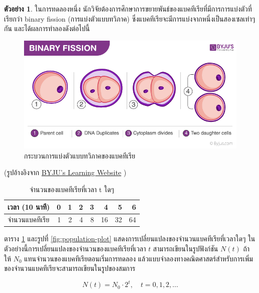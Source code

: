 \documentclass[landscape, 20pt]{extarticle}
\theoremstyle{definition}
\newtheorem{example}{ตัวอย่าง}[section]
\theoremstyle{remark}
\begin{document}
\begin{example}
\protect\hypertarget{exm:exm1}{}\label{exm:exm1}ในการทดลองหนึ่ง นักวิจัยต้องการศึกษาการขยายพันธ์ของแบคทีเรียที่มีการการแบ่งตัวที่เรียกว่า binary fission (การแบ่งตัวแบบทวิภาค) ซึ่งแบคทีเรียจะมีการแบ่งจากหนึ่งเป็นสองเซลเท่าๆ กัน และได้ผลการทำลองดังต่อไปนี้
\end{example}

\begin{figure}
\includegraphics[width=1\linewidth]{fig-binary-fission} \caption{กระบวนการแบ่งตัวแบบทวิภาคของแบคทีเรีย}\label{fig:fig-binary-fission}
\end{figure}

(รูปอ้างอิงจาก \href{https://byjus.com/biology/binary-fission/}{BYJU's Learning Website} )

\begin{table}

\caption{\label{tab:bacteria-table}จำนวนของแบคทีเรียที่เวลา t ใดๆ}
\centering
\begin{tabular}[t]{l|r|r|r|r|r|r|r}
\hline
เวลา (10 นาที) & 0 & 1 & 2 & 3 & 4 & 5 & 6\\
\hline
จำนวนแบคทีเรีย & 1 & 2 & 4 & 8 & 16 & 32 & 64\\
\hline
\end{tabular}
\end{table}

ตาราง \ref{tab:bacteria-table} และรูปที่ \ref{fig:population-plot} แสดงการเปลี่ยนแปลงของจำนวนแบคทีเรียที่เวลาใดๆ ในตัวอย่างนี้การเปลี่ยนแปลงของจำนวนของแบคทีเรียที่เวลา \(t\) สามารถเขียนในรูปฟังก์ชัน \(N(t)\) ถ้าให้ \(N_0\) แทนจำนวนของแบคทีเรียตอนเริ่มการทดลอง แล้วแบบจำลองทางคณิตศาสตร์สำหรับการเพิ่มของจำนวนแบคทีเรียจะสามารถเขียนในรูปของสมการ

\begin{equation}
N(t) = N_0 \cdot 2 ^t, \quad t = 0,1,2, \ldots
\label{eq:population-growth}
\end{equation}
\end{document}
